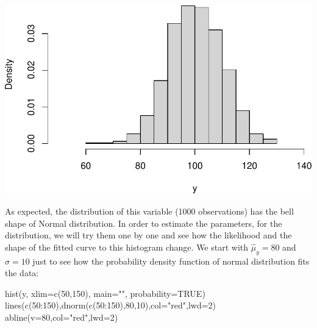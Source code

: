 \documentclass[
]{book}
\newenvironment{Shaded}{\begin{snugshade}}{\end{snugshade}}
\newcommand{\AttributeTok}[1]{\textcolor[rgb]{0.77,0.63,0.00}{#1}}
\newcommand{\ConstantTok}[1]{\textcolor[rgb]{0.00,0.00,0.00}{#1}}
\newcommand{\DecValTok}[1]{\textcolor[rgb]{0.00,0.00,0.81}{#1}}
\newcommand{\FunctionTok}[1]{\textcolor[rgb]{0.00,0.00,0.00}{#1}}
\newcommand{\NormalTok}[1]{#1}
\newcommand{\SpecialCharTok}[1]{\textcolor[rgb]{0.00,0.00,0.00}{#1}}
\newcommand{\StringTok}[1]{\textcolor[rgb]{0.31,0.60,0.02}{#1}}
\theoremstyle{definition}
\theoremstyle{definition}
\theoremstyle{definition}
\theoremstyle{definition}
\theoremstyle{remark}
\begin{document}
\includegraphics{Svetunkov---Statistics-for-Business-Analytics_files/figure-latex/unnamed-chunk-102-1.pdf}

As expected, the distribution of this variable (1000 observations) has the bell shape of Normal distribution. In order to estimate the parameters, for the distribution, we will try them one by one and see how the likelihood and the shape of the fitted curve to this histogram change. We start with \(\hat{\mu}_y=80\) and \(\hat{\sigma}=10\) just to see how the probability density function of normal distribution fits the data:

\begin{Shaded}
\begin{Highlighting}[]
\FunctionTok{hist}\NormalTok{(y, }\AttributeTok{xlim=}\FunctionTok{c}\NormalTok{(}\DecValTok{50}\NormalTok{,}\DecValTok{150}\NormalTok{), }\AttributeTok{main=}\StringTok{""}\NormalTok{, }\AttributeTok{probability=}\ConstantTok{TRUE}\NormalTok{)}
\FunctionTok{lines}\NormalTok{(}\FunctionTok{c}\NormalTok{(}\DecValTok{50}\SpecialCharTok{:}\DecValTok{150}\NormalTok{),}\FunctionTok{dnorm}\NormalTok{(}\FunctionTok{c}\NormalTok{(}\DecValTok{50}\SpecialCharTok{:}\DecValTok{150}\NormalTok{),}\DecValTok{80}\NormalTok{,}\DecValTok{10}\NormalTok{),}\AttributeTok{col=}\StringTok{"red"}\NormalTok{,}\AttributeTok{lwd=}\DecValTok{2}\NormalTok{)}
\FunctionTok{abline}\NormalTok{(}\AttributeTok{v=}\DecValTok{80}\NormalTok{,}\AttributeTok{col=}\StringTok{"red"}\NormalTok{,}\AttributeTok{lwd=}\DecValTok{2}\NormalTok{)}
\end{Highlighting}
\end{Shaded}
\end{document}
